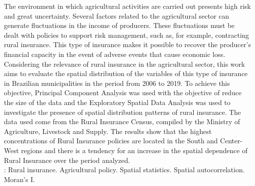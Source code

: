 The environment in which agricultural activities are carried out presents high risk and great uncertainty. Several factors related to the agricultural sector can generate fluctuations in the income of producers. These fluctuations must be dealt with policies to support risk management, such as, for example, contracting rural insurance. This type of insurance makes it possible to recover the producer's financial capacity in the event of adverse events that cause economic loss. Considering the relevance of rural insurance in the agricultural sector, this work aims to evaluate the spatial distribution of the variables of this type of insurance in Brazilian municipalities in the period from 2006 to 2019. To achieve this objective, Principal Component Analysis was used with the objective of reduce the size of the data and the Exploratory Spatial Data Analysis was used to investigate the presence of spatial distribution patterns of rural insurance. The data used come from the Rural Insurance Census, compiled by the Ministry of Agriculture, Livestock and Supply. The results show that the highest concentrations of Rural Insurance policies are located in the South and Center-West regions and there is a tendency for an increase in the spatial dependence of Rural Insurance over the period analyzed. \\
\newline
{}: Rural insurance. Agricultural policy. Spatial statistics. Spatial autocorrelation. Moran's I.
